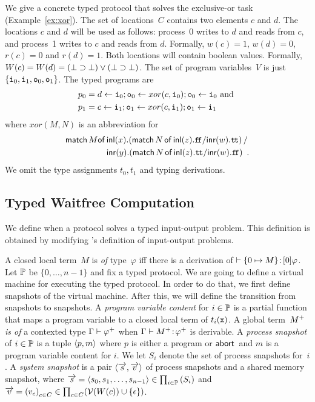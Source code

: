  \begin{example}
  \label{ex:xor-protocol}
  We give a concrete typed protocol that solves the exclusive-or task
  (Example~\ref{ex:xor}).
  The set of locations~$C$ contains two elements $c$ and $d$.
  The locations $c$ and $d$ will be used as follows:
  process~0 writes to $d$ and reads from $c$, and process~1
  writes to $c$ and reads from $d$.
  Formally, $w(c) = 1$, $w(d) = 0$, $r(c) = 0$ and $r(d) = 1$.
  Both locations will contain boolean values.
  Formally, $W(c) = W(d) = (\bot\supset\bot)\lor(\bot\supset\bot)$.
  The set of program variables~$V$ is just $\{\texttt{i}_0, \texttt{i}_1, \texttt{o}_0, \texttt{o}_1\}$.
  The typed programs are
  \begin{align*}
   p_0 &= d\leftarrow \texttt{i}_0; \texttt{o}_0\leftarrow xor(c, \texttt{i}_0); \texttt{o}_0
   \leftarrow \texttt{i}_0 \text{ and }\\
   p_1 &= c\leftarrow \texttt{i}_1; \texttt{o}_1\leftarrow xor(c, \texttt{i}_1); \texttt{o}_1
   \leftarrow \texttt{i}_1
  \end{align*}
  where $xor(M,N)$ is an abbreviation for
  \begin{align*}
  \mathsf{match\,}{M}\mathsf{of}\,&\mathsf{inl}({x}).{
  (\mathsf{match}\,{N}\,\mathsf{of}\, \mathsf{inl}({z}). {\texttt{f\kern -1.7pt f}}/ \mathsf{inr}({w}). {\texttt{t\kern -1.2pt t}})
  }\,/\\ &\mathsf{inr}({y}).{
  (\mathsf{match}\,{N}\,\mathsf{of}\, \mathsf{inl}({z}). {\texttt{t\kern -1.2pt t}}/ \mathsf{inr}({w}). {\texttt{f\kern -1.7pt f}})
  }\enspace.
  \end{align*}
  We omit the type assignments $t_0, t_1$ and typing derivations.
 \end{example}

\subsection{Typed Waitfree Computation}

We define when a protocol solves a typed
input-output problem.
This definition is obtained by modifying \citet{Saks:1993vq}'s
definition of input-output problems.

A closed local term~$M$ is \textit{of} type~$\varphi$ iff there is
a derivation of $\vdash {\{0\mapsto M\}} \mathord{\colon\kern -2pt}{[0]\varphi}$.
Let $\mathbb{P}$ be $\{0,\ldots, n-1\}$ and fix a typed protocol.
We are going to define a virtual machine for executing the typed
protocol.
In order to do that, we first define snapshots of the virtual machine.
After this, we will define the transition from snapshots to snapshots.
A \textit{program variable content} for
$i\in\mathbb{P}$ is a
partial function that maps a program variable to a closed local term of
$t_i(\texttt{x})$.
A global term~${M}^+$ \textit{is of} a contexted type $\Gamma\vdash{\varphi}^+$ when
$\Gamma\vdash{{M}^+} \mathord{\colon\kern -2pt}{{\varphi}^+}$ is derivable.
A \textit{process snapshot} of $i\in\mathbb{P}$ is a tuple
$\langle{p,m}\rangle$ where $p$ is either a program or $\mathsf{abort\,}$ and $m$ is a
program variable content for $i$.
We let $S_i$ denote the set of process snapshots for~$i$.
A \textit{system snapshot}
is a pair $\langle{\overrightarrow s, \overrightarrow v}\rangle$ of process snapshots and a shared
memory snapshot, where $\overrightarrow s = \langle{s_0,
{s_1,{\ldots,s_{n-1}}}}\rangle \in
\prod_{i\in \mathbb{P}}\left(S_i\right)
$
and
$\overrightarrow v =
\left(v_c\right)_{c\in C} \in \prod_{c\in C}(\mathcal{V}(W(c))\cup\{\epsilon\})
$.

